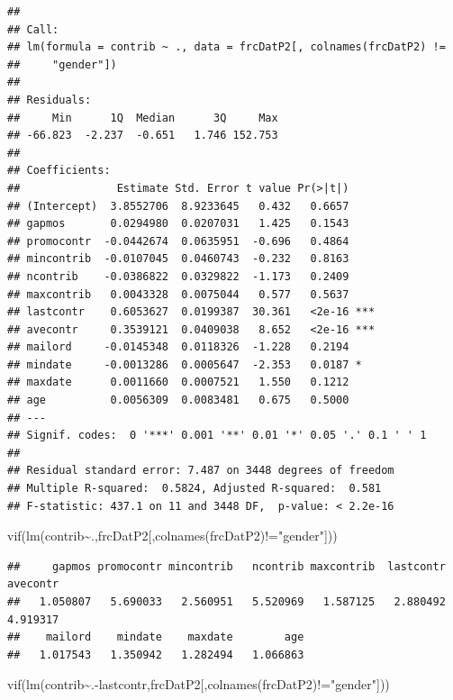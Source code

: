 \documentclass[
]{article}
\newenvironment{Shaded}{\begin{snugshade}}{\end{snugshade}}
\newcommand{\FunctionTok}[1]{\textcolor[rgb]{0.00,0.00,0.00}{#1}}
\newcommand{\NormalTok}[1]{#1}
\newcommand{\SpecialCharTok}[1]{\textcolor[rgb]{0.00,0.00,0.00}{#1}}
\newcommand{\StringTok}[1]{\textcolor[rgb]{0.31,0.60,0.02}{#1}}
\begin{document}
\begin{verbatim}
## 
## Call:
## lm(formula = contrib ~ ., data = frcDatP2[, colnames(frcDatP2) != 
##     "gender"])
## 
## Residuals:
##     Min      1Q  Median      3Q     Max 
## -66.823  -2.237  -0.651   1.746 152.753 
## 
## Coefficients:
##               Estimate Std. Error t value Pr(>|t|)    
## (Intercept)  3.8552706  8.9233645   0.432   0.6657    
## gapmos       0.0294980  0.0207031   1.425   0.1543    
## promocontr  -0.0442674  0.0635951  -0.696   0.4864    
## mincontrib  -0.0107045  0.0460743  -0.232   0.8163    
## ncontrib    -0.0386822  0.0329822  -1.173   0.2409    
## maxcontrib   0.0043328  0.0075044   0.577   0.5637    
## lastcontr    0.6053627  0.0199387  30.361   <2e-16 ***
## avecontr     0.3539121  0.0409038   8.652   <2e-16 ***
## mailord     -0.0145348  0.0118326  -1.228   0.2194    
## mindate     -0.0013286  0.0005647  -2.353   0.0187 *  
## maxdate      0.0011660  0.0007521   1.550   0.1212    
## age          0.0056309  0.0083481   0.675   0.5000    
## ---
## Signif. codes:  0 '***' 0.001 '**' 0.01 '*' 0.05 '.' 0.1 ' ' 1
## 
## Residual standard error: 7.487 on 3448 degrees of freedom
## Multiple R-squared:  0.5824, Adjusted R-squared:  0.581 
## F-statistic: 437.1 on 11 and 3448 DF,  p-value: < 2.2e-16
\end{verbatim}

\begin{Shaded}
\begin{Highlighting}[]
\FunctionTok{vif}\NormalTok{(}\FunctionTok{lm}\NormalTok{(contrib}\SpecialCharTok{\textasciitilde{}}\NormalTok{.,frcDatP2[,}\FunctionTok{colnames}\NormalTok{(frcDatP2)}\SpecialCharTok{!=}\StringTok{"gender"}\NormalTok{]))}
\end{Highlighting}
\end{Shaded}

\begin{verbatim}
##     gapmos promocontr mincontrib   ncontrib maxcontrib  lastcontr   avecontr 
##   1.050807   5.690033   2.560951   5.520969   1.587125   2.880492   4.919317 
##    mailord    mindate    maxdate        age 
##   1.017543   1.350942   1.282494   1.066863
\end{verbatim}

\begin{Shaded}
\begin{Highlighting}[]
\FunctionTok{vif}\NormalTok{(}\FunctionTok{lm}\NormalTok{(contrib}\SpecialCharTok{\textasciitilde{}}\NormalTok{.}\SpecialCharTok{{-}}\NormalTok{lastcontr,frcDatP2[,}\FunctionTok{colnames}\NormalTok{(frcDatP2)}\SpecialCharTok{!=}\StringTok{"gender"}\NormalTok{]))}
\end{Highlighting}
\end{Shaded}
\end{document}
